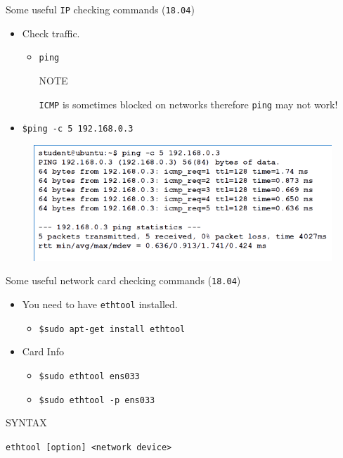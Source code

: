 \documentclass{beamer}
\begin{document}
\begin{frame}{Some useful \texttt{IP} checking commands (\texttt{18.04})}
  \begin{itemize}
    \item Check traffic.
    \begin{itemize}
      \item \texttt{ping}  
      \begin{block}{NOTE}
        \begin{center}
          \texttt{ICMP} is sometimes blocked on networks therefore \texttt{ping} may not work!
        \end{center}
      \end{block}          
    \end{itemize}
    \item \texttt{\$ping -c 5 192.168.0.3}
  \end{itemize}
  \begin{figure}
    \begin{center}
      \includegraphics[width=0.8\linewidth]{ping.png}
    \end{center}
  \end{figure}
\end{frame}

\begin{frame}{Some useful network card checking commands (\texttt{18.04})}
  \begin{itemize}
    \item You need to have \texttt{ethtool} installed.
    \begin{itemize}
      \item \texttt{\$sudo apt-get install ethtool}
    \end{itemize}
    \item Card Info
    \begin{itemize}
      \item \texttt{\$sudo ethtool ens033}
      \item \texttt{\$sudo ethtool -p ens033}
    \end{itemize}
  \end{itemize}
  \begin{block}{SYNTAX}
    \begin{center}
      \texttt{ethtool [option] <network device>}
    \end{center}
  \end{block}
\end{frame}
\end{document}

